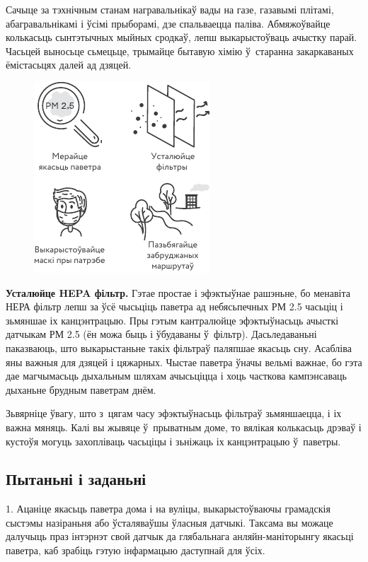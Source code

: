 
Сачыце за тэхнічным станам награвальнікаў вады на газе, газавымі плітамі, абагравальнікамі і ўсімі прыборамі, дзе спальваецца паліва. Абмяжоўвайце колькасьць сынтэтычных мыйных сродкаў, лепш выкарыстоўваць ачыстку парай. Часьцей выносьце сьмецьце, трымайце бытавую хімію ў~старанна закаркаваных ёмістасьцях далей ад дзяцей.

\begin{figure}[htb!]
  \centering
  \includegraphics[scale=1.5]{willpower/ch11/5.pdf}
\end{figure}

\textbf{Усталюйце HEPA фільтр.} Гэтае простае і эфэктыўнае рашэньне, бо менавіта НЕРА фільтр лепш за ўсё чысьціць паветра ад небясьпечных РМ 2.5 часьціц і зьмяншае іх канцэнтрацыю. Пры гэтым кантралюйце эфэктыўнасьць ачысткі датчыкам РМ 2.5 (ён можа быць і ўбудаваны ў~фільтр). Дасьледаваньні паказваюць, што выкарыстаньне такіх фільтраў паляпшае якасьць сну. Асабліва яны важныя для дзяцей і цяжарных. Чыстае паветра ўначы вельмі важнае, бо гэта дае магчымасьць дыхальным шляхам ачысьціцца і хоць часткова кампэнсаваць дыханьне брудным паветрам днём.

Зьвярніце ўвагу, што з~цягам часу эфэктыўнасьць фільтраў зьмяншаецца, і іх важна мяняць. Калі вы жывяце ў~прыватным доме, то вялікая колькасьць дрэваў і кустоўя могуць захопліваць часьціцы і зьніжаць іх канцэнтрацыю ў~паветры.

\subsection*{Пытаньні і заданьні}

1. Ацаніце якасьць паветра дома і на вуліцы, выкарыстоўваючы грамадскія сыстэмы назіраньня або ўсталяваўшы ўласныя датчыкі. Таксама вы можаце далучыць праз інтэрнэт свой датчык да глябальнага анляйн-маніторынгу якасьці паветра, каб зрабіць гэтую інфармацыю даступнай для ўсіх.

